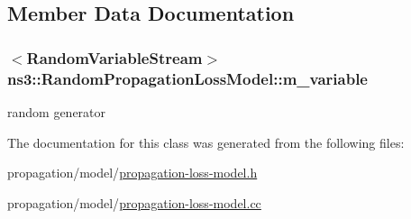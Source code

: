 \subsection{Member Data Documentation}
\subsubsection[{\texorpdfstring{m\+\_\+variable}{m_variable}}]{$<${\bf Random\+Variable\+Stream}$>$ ns3\+::\+Random\+Propagation\+Loss\+Model\+::m\+\_\+variable\hspace{0.3cm}{\ttfamily [private]}}\hypertarget{classns3_1_1RandomPropagationLossModel_ab627114b1d471e4b5d2192ed3542c7af}{}\label{classns3_1_1RandomPropagationLossModel_ab627114b1d471e4b5d2192ed3542c7af}


random generator 



The documentation for this class was generated from the following files\+:\begin{DoxyCompactItemize}
\item 
propagation/model/\hyperlink{propagation-loss-model_8h}{propagation-\/loss-\/model.\+h}\item 
propagation/model/\hyperlink{propagation-loss-model_8cc}{propagation-\/loss-\/model.\+cc}\end{DoxyCompactItemize}
